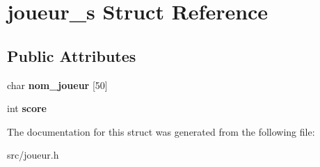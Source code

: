 \hypertarget{structjoueur__s}{}\section{joueur\+\_\+s Struct Reference}
\label{structjoueur__s}
\subsection*{Public Attributes}
\begin{DoxyCompactItemize}
\item 
char {\bfseries nom\+\_\+joueur} \mbox{[}50\mbox{]}\hypertarget{structjoueur__s_a26638b5da4a078e54282f47c64f86df3}{}\label{structjoueur__s_a26638b5da4a078e54282f47c64f86df3}

\item 
int {\bfseries score}\hypertarget{structjoueur__s_a403729367527db1e5b348a6e82dee49b}{}\label{structjoueur__s_a403729367527db1e5b348a6e82dee49b}

\end{DoxyCompactItemize}


The documentation for this struct was generated from the following file\+:\begin{DoxyCompactItemize}
\item 
src/joueur.\+h\end{DoxyCompactItemize}
